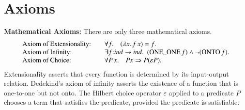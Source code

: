 \documentclass[cup9a]{cupbook}
\def\tc{\hbox{:}}
\begin{document}
\section{Axioms}


{\bf Mathematical Axioms:} There are only three mathematical axioms.
$$\begin{array}{lll}
\hbox{Axiom of Extensionality:} &\quad\forall f.\hskip1em(\lambda x.\, f\, x) = f.\\
\hbox{Axiom of Infinity:} &\quad\exists f\tc ind\to ind.~~(\op{ONE\_ONE}\,f) \land \neg(\op{ONTO}\, f).\\
\hbox{Axiom of Choice:}&\quad  
\forall P\,x.\hskip1em P x \Rightarrow  P(\varepsilon P).\\
\end{array}
$$
Extensionality asserts that every function is determined by its input-output relation. Dedekind's axiom of infinity asserts the existence of a function that is one-to-one but not onto.  The Hilbert choice operator $\varepsilon$ applied to a predicate $P$ chooses a term that satisfies the predicate, provided the
predicate is satisfiable.
\end{document}
